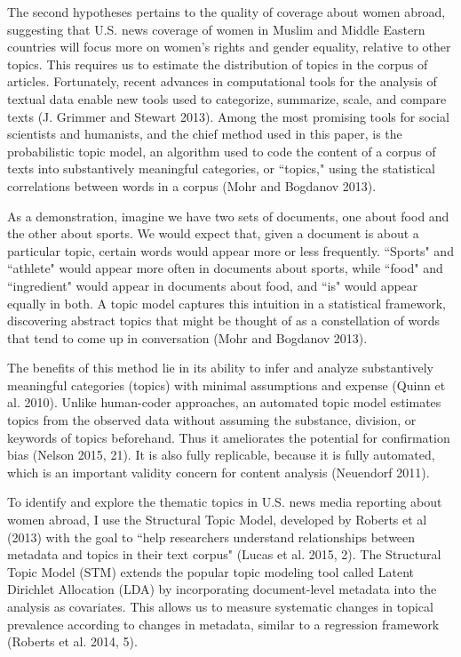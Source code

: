 \documentclass[11pt, oneside]{article}
\begin{document}
The second hypotheses pertains to the quality of coverage about women abroad, suggesting that U.S. news coverage of women in Muslim and Middle Eastern countries will focus more on women's rights and gender equality, relative to other topics. This requires us to estimate the distribution of topics in the corpus of articles. Fortunately, recent advances in computational tools for the analysis of textual data enable new tools used to categorize, summarize, scale, and compare texts (J. Grimmer and Stewart 2013). Among the most promising tools for social scientists and humanists, and the chief method used in this paper, is the probabilistic topic model, an algorithm used to code the content of a corpus of texts into substantively meaningful categories, or ``topics," using the statistical correlations between words in a corpus (Mohr and Bogdanov 2013).

As a demonstration, imagine we have two sets of documents, one about food and the other about sports. We would expect that, given a document is about a particular topic, certain words would appear more or less frequently. ``Sports" and ``athlete" would appear more often in documents about sports, while ``food" and ``ingredient" would appear in documents about food, and ``is" would appear equally in both. A topic model captures this intuition in a statistical framework, discovering abstract topics that might be thought of as a constellation of words that tend to come up in conversation (Mohr and Bogdanov 2013). 

The benefits of this method lie in its ability to infer and analyze substantively meaningful categories (topics) with minimal assumptions and expense (Quinn et al. 2010). Unlike human-coder approaches, an automated topic model estimates topics from the observed data without assuming the substance, division, or keywords of topics beforehand. Thus it ameliorates the potential for confirmation bias (Nelson 2015, 21). It is also fully replicable, because it is fully automated, which is an important validity concern for content analysis (Neuendorf 2011). 

To identify and explore the thematic topics in U.S. news media reporting about women abroad, I use the Structural Topic Model, developed by Roberts et al (2013) with the goal to ``help researchers understand relationships between metadata and topics in their text corpus" (Lucas et al. 2015, 2). The Structural Topic Model (STM) extends the popular topic modeling tool called Latent Dirichlet Allocation (LDA) by incorporating document-level metadata into the analysis as covariates. This allows us to measure systematic changes in topical prevalence according to changes in metadata, similar to a regression framework (Roberts et al. 2014, 5). 
\end{document}

